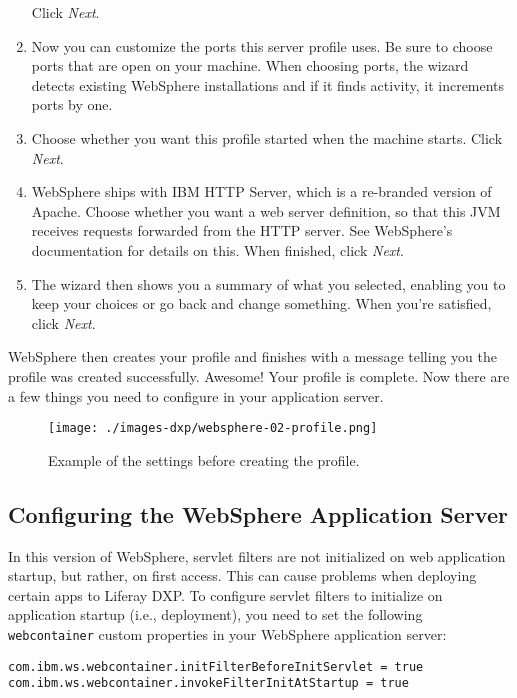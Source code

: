 \begin{enumerate}
  Click \emph{Next}.
\item
  Now you can customize the ports this server profile uses. Be sure to
  choose ports that are open on your machine. When choosing ports, the
  wizard detects existing WebSphere installations and if it finds
  activity, it increments ports by one.
\item
  Choose whether you want this profile started when the machine starts.
  Click \emph{Next}.
\item
  WebSphere ships with IBM HTTP Server, which is a re-branded version of
  Apache. Choose whether you want a web server definition, so that this
  JVM receives requests forwarded from the HTTP server. See WebSphere's
  documentation for details on this. When finished, click \emph{Next}.
\item
  The wizard then shows you a summary of what you selected, enabling you
  to keep your choices or go back and change something. When you're
  satisfied, click \emph{Next}.
\end{enumerate}

WebSphere then creates your profile and finishes with a message telling
you the profile was created successfully. Awesome! Your profile is
complete. Now there are a few things you need to configure in your
application server.

\begin{figure}
\centering
\texttt{[image: ./images-dxp/websphere-02-profile.png]}
\caption{Example of the settings before creating the profile.}
\end{figure}

\subsection{Configuring the WebSphere Application
Server}\label{configuring-the-websphere-application-server}

In this version of WebSphere, servlet filters are not initialized on web
application startup, but rather, on first access. This can cause
problems when deploying certain apps to Liferay DXP. To configure
servlet filters to initialize on application startup (i.e., deployment),
you need to set the following \texttt{webcontainer} custom properties in
your WebSphere application server:

\begin{verbatim}
com.ibm.ws.webcontainer.initFilterBeforeInitServlet = true
com.ibm.ws.webcontainer.invokeFilterInitAtStartup = true
\end{verbatim}

